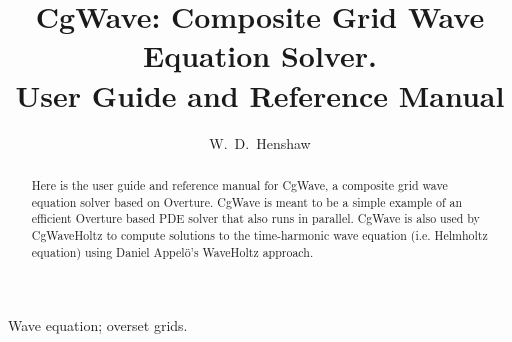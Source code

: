 \documentclass[preprint,11pt]{elsarticle}
\begin{document}
\small
{}
\lstset{style=myc}

\begin{frontmatter}
\title{
CgWave: Composite Grid Wave Equation Solver. \\
User Guide and Reference Manual
}

\author[rpi]{W.~D.~Henshaw}

\address[rpi]{Department of Mathematical Sciences, Rensselaer Polytechnic Institute, Troy, NY 12180, USA}






\begin{abstract}

Here is the user guide and reference manual for CgWave, a composite grid wave equation solver based
on Overture. CgWave is meant to be a simple example of an efficient Overture based PDE solver
that also runs in parallel. CgWave is also used by CgWaveHoltz to compute solutions to the
time-harmonic wave equation (i.e. Helmholtz equation) using Daniel Appel\"o's WaveHoltz approach.

\end{abstract}

\begin{keyword}
Wave equation; overset grids.
\end{keyword}

\end{frontmatter}


\tableofcontents
%

\end{document}
